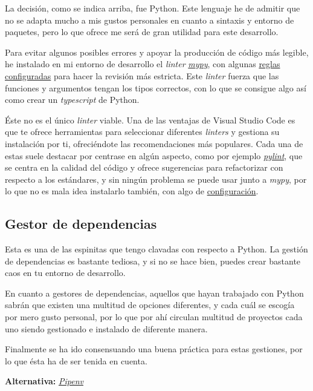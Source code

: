 La decisión, como se indica arriba, fue Python. Este lenguaje he de admitir que no se adapta mucho a mis gustos personales en cuanto a sintaxis y entorno de paquetes, pero lo que ofrece me será de gran utilidad para este desarrollo.

Para evitar algunos posibles errores y apoyar la producción de código más legible, he instalado en mi entorno de desarrollo el \textit{linter} \href{http://mypy-lang.org/}{\textit{mypy}}, con algunas \href{https://github.com/Anglepi/My-Many-Reads/blob/main/.mypy.ini}{reglas configuradas} para hacer la revisión más estricta. Este \textit{linter} fuerza que las funciones y argumentos tengan los tipos correctos, con lo que se consigue algo así como crear un \textit{typescript} de Python.

Éste no es el único \textit{linter} viable. Una de las ventajas de Visual Studio Code es que te ofrece herramientas para seleccionar diferentes \textit{linters} y gestiona su instalación por ti, ofreciéndote las recomendaciones más populares. Cada una de estas suele destacar por centrase en algún aspecto, como por ejemplo \href{https://pypi.org/project/pylint/}{\textit{pylint}}, que se centra en la calidad del código y ofrece sugerencias para refactorizar con respecto a los estándares, y sin ningún problema se puede usar junto a \textit{mypy}, por lo que no es mala idea instalarlo también, con algo de \href{https://github.com/Anglepi/My-Many-Reads/blob/main/.pylintrc.ini}{configuración}.

\subsection{Gestor de dependencias}

Esta es una de las espinitas que tengo clavadas con respecto a Python. La gestión de dependencias es bastante tediosa, y si no se hace bien, puedes crear bastante caos en tu entorno de desarrollo.

En cuanto a gestores de dependencias, aquellos que hayan trabajado con Python sabrán que existen una multitud de opciones diferentes, y cada cuál se escogía por mero gusto personal, por lo que por ahí circulan multitud de proyectos cada uno siendo gestionado e instalado de diferente manera.

Finalmente se ha ido consensuando una buena práctica para estas gestiones, por lo que ésta ha de ser tenida en cuenta.

\textbf{Alternativa:} \href{https://pipenv-es.readthedocs.io/es/latest/}{\textit{Pipenv}}

